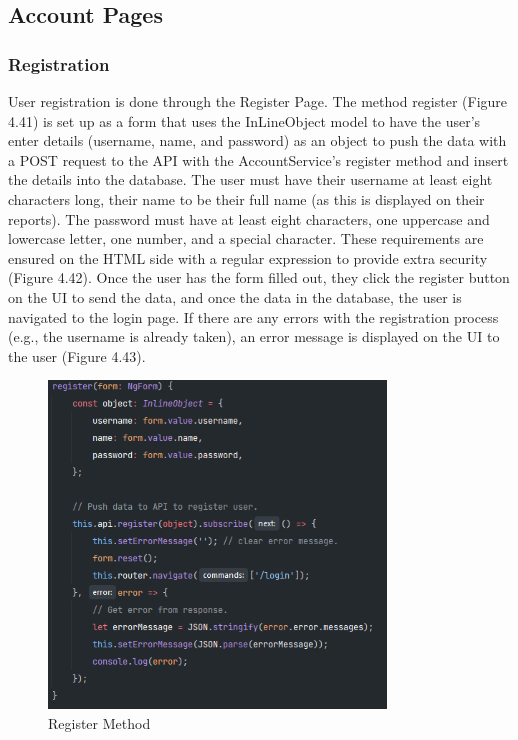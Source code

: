 \subsection{Account Pages}

\subsubsection{Registration}
User registration is done through the Register Page. The method register (Figure 4.41) is set up as a form that uses the InLineObject model to have the user's enter details (username, name, and password) as an object to push the data with a POST request to the API with the AccountService's register method and insert the details into the database. The user must have their username at least eight characters long, their name to be their full name (as this is displayed on their reports). The password must have at least eight characters, one uppercase and lowercase letter, one number, and a special character. These requirements are ensured on the HTML side with a regular expression to provide extra security (Figure 4.42). Once the user has the form filled out, they click the register button on the UI to send the data, and once the data in the database, the user is navigated to the login page. If there are any errors with the registration process (e.g., the username is already taken), an error message is displayed on the UI to the user (Figure 4.43).

\begin{figure}[H]
    \caption{Register Method}
    \label{image:registerMethod}
    \centering
    \includegraphics[width=0.8\textwidth]{images/repota/account_pages/register.png}
\end{figure}

